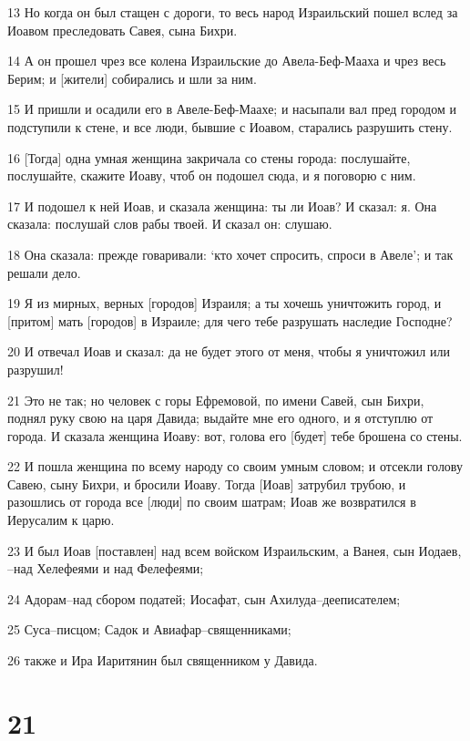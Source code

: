 \par 13 Но когда он был стащен с дороги, то весь народ Израильский пошел вслед за Иоавом преследовать Савея, сына Бихри.
\par 14 А он прошел чрез все колена Израильские до Авела-Беф-Мааха и чрез весь Берим; и [жители] собирались и шли за ним.
\par 15 И пришли и осадили его в Авеле-Беф-Маахе; и насыпали вал пред городом и подступили к стене, и все люди, бывшие с Иоавом, старались разрушить стену.
\par 16 [Тогда] одна умная женщина закричала со стены города: послушайте, послушайте, скажите Иоаву, чтоб он подошел сюда, и я поговорю с ним.
\par 17 И подошел к ней Иоав, и сказала женщина: ты ли Иоав? И сказал: я. Она сказала: послушай слов рабы твоей. И сказал он: слушаю.
\par 18 Она сказала: прежде говаривали: `кто хочет спросить, спроси в Авеле'; и так решали дело.
\par 19 Я из мирных, верных [городов] Израиля; а ты хочешь уничтожить город, и [притом] мать [городов] в Израиле; для чего тебе разрушать наследие Господне?
\par 20 И отвечал Иоав и сказал: да не будет этого от меня, чтобы я уничтожил или разрушил!
\par 21 Это не так; но человек с горы Ефремовой, по имени Савей, сын Бихри, поднял руку свою на царя Давида; выдайте мне его одного, и я отступлю от города. И сказала женщина Иоаву: вот, голова его [будет] тебе брошена со стены.
\par 22 И пошла женщина по всему народу со своим умным словом; и отсекли голову Савею, сыну Бихри, и бросили Иоаву. Тогда [Иоав] затрубил трубою, и разошлись от города все [люди] по своим шатрам; Иоав же возвратился в Иерусалим к царю.
\par 23 И был Иоав [поставлен] над всем войском Израильским, а Ванея, сын Иодаев, --над Хелефеями и над Фелефеями;
\par 24 Адорам--над сбором податей; Иосафат, сын Ахилуда--дееписателем;
\par 25 Суса--писцом; Садок и Авиафар--священниками;
\par 26 также и Ира Иаритянин был священником у Давида.

\chapter{21}

